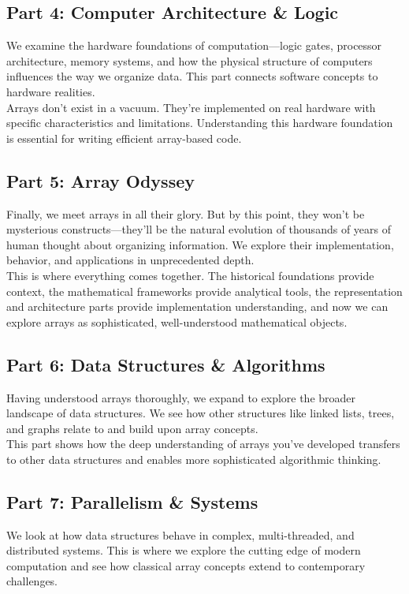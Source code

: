 \subsection*{Part 4: Computer Architecture \& Logic}
We examine the hardware foundations of computation—logic gates, processor architecture, memory systems, and how the physical structure of computers influences the way we organize data. This part connects software concepts to hardware realities.\\
Arrays don't exist in a vacuum. They're implemented on real hardware with specific characteristics and limitations. Understanding this hardware foundation is essential for writing efficient array-based code.

\subsection*{Part 5: Array Odyssey}
Finally, we meet arrays in all their glory. But by this point, they won't be mysterious constructs—they'll be the natural evolution of thousands of years of human thought about organizing information. We explore their implementation, behavior, and applications in unprecedented depth.\\
This is where everything comes together. The historical foundations provide context, the mathematical frameworks provide analytical tools, the representation and architecture parts provide implementation understanding, and now we can explore arrays as sophisticated, well-understood mathematical objects.

\subsection*{Part 6: Data Structures \& Algorithms}
Having understood arrays thoroughly, we expand to explore the broader landscape of data structures. We see how other structures like linked lists, trees, and graphs relate to and build upon array concepts.\\
This part shows how the deep understanding of arrays you've developed transfers to other data structures and enables more sophisticated algorithmic thinking.

\subsection*{Part 7: Parallelism \& Systems}
We look at how data structures behave in complex, multi-threaded, and distributed systems. This is where we explore the cutting edge of modern computation and see how classical array concepts extend to contemporary challenges.\newpage

